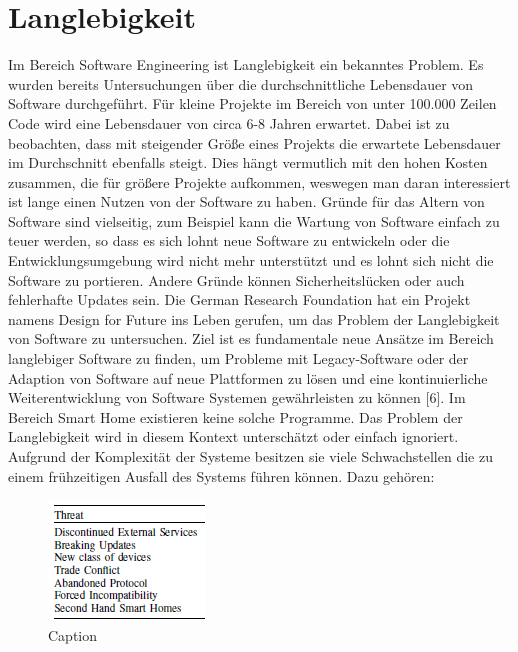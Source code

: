 \section{Langlebigkeit}
Im Bereich Software Engineering ist Langlebigkeit ein bekanntes Problem. Es wurden bereits Untersuchungen über die durchschnittliche 
Lebensdauer von Software durchgeführt. Für kleine Projekte im Bereich von unter 100.000 Zeilen Code wird eine Lebensdauer von circa 
6-8 Jahren erwartet. Dabei ist zu beobachten, dass mit steigender Größe eines Projekts die erwartete Lebensdauer im Durchschnitt
ebenfalls steigt. Dies hängt vermutlich mit den hohen Kosten zusammen, die für größere Projekte aufkommen, weswegen man daran
interessiert ist lange einen Nutzen von der Software zu haben. Gründe für das Altern von Software sind vielseitig, zum Beispiel kann
die Wartung von Software einfach zu teuer werden, so dass es sich lohnt neue Software zu entwickeln oder die Entwicklungsumgebung wird
nicht mehr unterstützt und es lohnt sich nicht die Software zu portieren. Andere Gründe können Sicherheitslücken oder auch fehlerhafte 
Updates sein. Die German Research Foundation hat ein Projekt namens Design for Future ins Leben gerufen, um das Problem der Langlebigkeit
von Software zu untersuchen. Ziel ist es fundamentale neue Ansätze im Bereich langlebiger Software zu finden, um Probleme mit Legacy-Software
oder der Adaption von Software auf neue Plattformen zu lösen und eine kontinuierliche Weiterentwicklung von Software Systemen gewährleisten 
zu können [6].
Im Bereich Smart Home existieren keine solche Programme. Das Problem der Langlebigkeit wird in diesem Kontext unterschätzt oder einfach ignoriert.
Aufgrund der Komplexität der Systeme besitzen sie viele Schwachstellen die zu einem frühzeitigen Ausfall des Systems führen können. Dazu gehören:

\begin{figure}[h]
\centering
\includegraphics{"Threats"}
\caption{Caption}
\label{fig:Prob1:MEA}
\end{figure}

